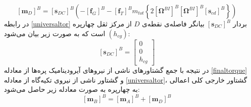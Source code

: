 \begin{equation}\label{universaltor}
	\left[\boldsymbol m_D\right]^B = \left[\boldsymbol s_{DC}\right]^B\left(
	-\left[\boldsymbol f_G\right]^B
	-\left[\boldsymbol f_T\right]^B
	m_{tot}\left\{2
	\left[\boldsymbol \Omega^{BI}\right]^B
	\left[\boldsymbol \Omega^{BI}\right]^B
	\left[\boldsymbol s_{cd}\right]^B
	\right\}
	\right)
\end{equation}
در رابطه
\ref{universaltor}
بردار 
$\left[\boldsymbol s_{DC}\right]^B$
بیانگر فاصله‌ی نقطه‌ی 
$D$
از مرکز ثقل چهارپره 
$(h_{cg})$
است که به صورت زیر بیان می‌شود:
\begin{equation}
	\left[\boldsymbol s_{DC}\right]^B = \begin{bmatrix}
		0\\0\\h_{cg}
	\end{bmatrix}
\end{equation}
 در نتیجه با جمع گشتاورهای ناشی از نیروهای آیرودینامیک پره‌ها از معادله 
 \ref{finaltorque}
 و گشتاور ناشی 
از نیروی تكیه‌گاه از معادله 
\ref{universaltor}، گشتاور خارجی کلی اعمالی به چهارپره به صورت معادله زیر حاصل 
می‌شود:
\begin{equation}\label{finalm}
	\left[\boldsymbol m_B\right]^B = 
	\left[\boldsymbol m_A\right]^B+
	\left[\boldsymbol m_D\right]^B
\end{equation}

